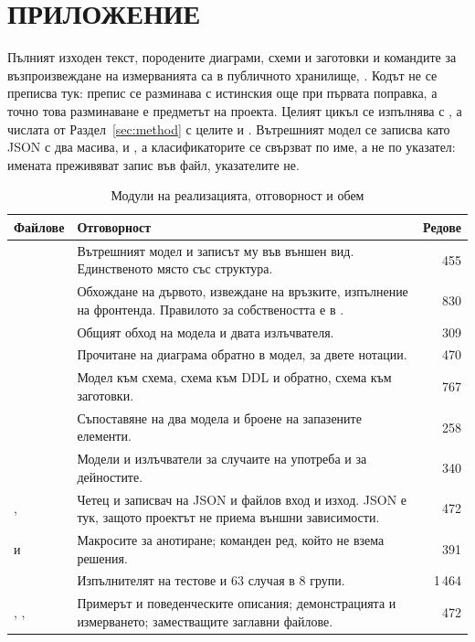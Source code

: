 \section*{ПРИЛОЖЕНИЕ}
\label{sec:appendix}

Пълният изходен текст, породените диаграми, схеми и заготовки и командите за възпроизвеждане на
измерванията са в публичното хранилище, . Кодът не
се преписва тук: препис се разминава с истинския още при първата поправка, а точно това разминаване е
предметът на проекта. Целият цикъл се изпълнява с , а числата
от Раздел~\ref{sec:method} с целите  и . Вътрешният модел се записва
като JSON с два масива,  и , а класификаторите се свързват по име, а
не по указател: имената преживяват запис във файл, указателите не.

\begin{table}[H]
\caption{Модули на реализацията, отговорност и обем}
\label{tab:files}
\centering
{}
\fontsize{10}{11}\selectfont
\begin{tabular}{@{}L{3.2cm}L{7.4cm}r@{}}
\toprule
\textbf{Файлове} & \textbf{Отговорност} & \textbf{Редове} \\
\midrule
{} & Вътрешният модел и записът му във външен вид. Единственото място със структура. & 455 \\
 & Обхождане на дървото, извеждане на връзките, изпълнение на фронтенда. Правилото за собствеността е в . & 830 \\
    & Общият обход на модела и двата излъчвателя. & 309 \\
 & Прочитане на диаграма обратно в модел, за двете нотации. & 470 \\
  & Модел към схема, схема към DDL и обратно, схема към заготовки. & 767 \\
    & Съпоставяне на два модела и броене на запазените елементи. & 258 \\
 & Модели и излъчватели за случаите на употреба и за дейностите. & 340 \\
,  & Четец и записвач на JSON и файлов вход и изход. JSON е тук, защото проектът не приема външни зависимости. & 472 \\
 и  & Макросите за анотиране; команден ред, който не взема решения. & 391 \\
    & Изпълнителят на тестове и 63 случая в 8 групи. & 1\,464 \\
, ,  & Примерът и поведенческите описания; демонстрацията и измерването; заместващите заглавни файлове. & 472 \\
\bottomrule
\end{tabular}
\end{table}

